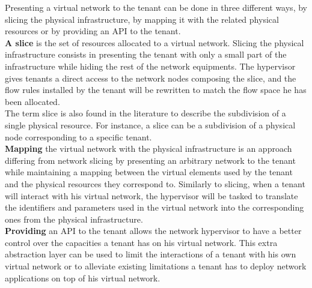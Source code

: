 Presenting a virtual network to the tenant can be done in three different ways, by slicing the physical infrastructure, by mapping it with the related physical resources or by providing an API to the tenant.\\
\textbf{A slice} is the set of resources allocated to a virtual network.
Slicing the physical infrastructure consists in presenting the tenant with only a small part of the infrastructure while hiding the rest of the network equipments.
The hypervisor gives tenants a direct access to the network nodes composing the slice, and the flow rules installed by the tenant will be rewritten to match the flow space he has been allocated.\\
The term slice is also found in the literature to describe the subdivision of a single physical resource. For instance, a slice can be a subdivision of a physical node corresponding to a specific tenant.\\
\textbf{Mapping} the virtual network with the physical infrastructure is an approach differing from network slicing by presenting an arbitrary network to the tenant while maintaining a mapping between the virtual elements used by the tenant and the physical resources they correspond to.
Similarly to slicing, when a tenant will interact with his virtual network, the hypervisor will be tasked to translate the identifiers and parameters used in the virtual network into the corresponding ones from the physical infrastructure.\\
\textbf{Providing} an API to the tenant allows the network hypervisor to have a better control over the capacities a tenant has on his virtual network. This extra abstraction layer can be used to limit the interactions of a tenant with his own virtual network or to alleviate existing limitations a tenant has to deploy network applications on top of his virtual network. 

